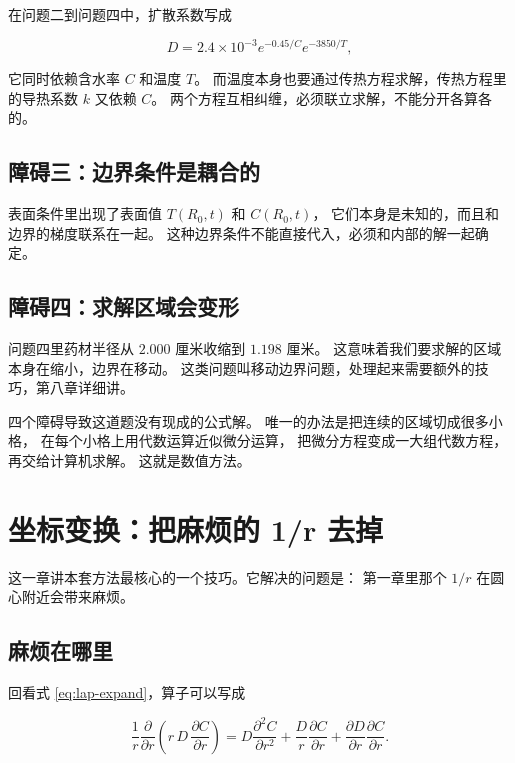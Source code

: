 在问题二到问题四中，扩散系数写成

\begin{equation}
D = 2.4\times10^{-3}e^{-0.45/C}e^{-3850/T},
\end{equation}

它同时依赖含水率 $C$ 和温度 $T$。
而温度本身也要通过传热方程求解，传热方程里的导热系数 $k$ 又依赖 $C$。
两个方程互相纠缠，必须联立求解，不能分开各算各的。

\subsection{障碍三：边界条件是耦合的}

表面条件里出现了表面值 $T(R_0,t)$ 和 $C(R_0,t)$，
它们本身是未知的，而且和边界的梯度联系在一起。
这种边界条件不能直接代入，必须和内部的解一起确定。

\subsection{障碍四：求解区域会变形}

问题四里药材半径从 $2.000$ 厘米收缩到 $1.198$ 厘米。
这意味着我们要求解的区域本身在缩小，边界在移动。
这类问题叫移动边界问题，处理起来需要额外的技巧，第八章详细讲。

\keypoint
四个障碍导致这道题没有现成的公式解。
唯一的办法是把连续的区域切成很多小格，
在每个小格上用代数运算近似微分运算，
把微分方程变成一大组代数方程，再交给计算机求解。
这就是数值方法。

\section{坐标变换：把麻烦的 1/r 去掉}

这一章讲本套方法最核心的一个技巧。它解决的问题是：
第一章里那个 $1/r$ 在圆心附近会带来麻烦。

\subsection{麻烦在哪里}

回看式 \eqref{eq:lap-expand}，算子可以写成

\begin{equation}
\frac{1}{r}\frac{\partial}{\partial r}\left(r\,D\,\frac{\partial C}{\partial r}\right)
= D\frac{\partial^2 C}{\partial r^2}
+ \frac{D}{r}\frac{\partial C}{\partial r}
+ \frac{\partial D}{\partial r}\frac{\partial C}{\partial r}.
\label{eq:singular}
\end{equation}


